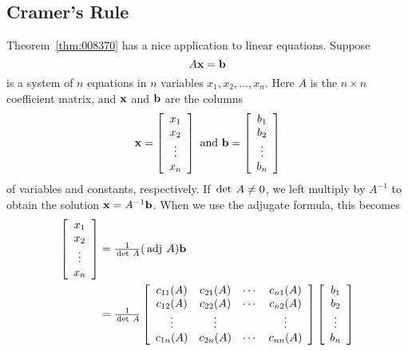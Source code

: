 \subsection*{Cramer's Rule}

Theorem~\ref{thm:008370} has a nice application to linear equations. Suppose
\begin{equation*}
A\textbf{x}=\textbf{b}
\end{equation*}
is a system of $n$ equations in $n$ variables $x_{1}, x_{2}, \dots , x_{n}$. Here $A$ is the $n \times n$ coefficient matrix, and $\textbf{x}$ and $\textbf{b}$ are the columns
\begin{equation*}
\textbf{x} = \left[ \begin{array}{c}
x_1 \\
x_2 \\
\vdots \\
x_n 
\end{array} \right] \mbox{ and }
\textbf{b} = \left[ \begin{array}{c}
b_1 \\
b_2 \\
\vdots \\
b_n 
\end{array} \right] 
\end{equation*}
of variables and constants, respectively. If $\thinspace\operatorname{det \medspace}A \neq 0$, we left multiply by $A^{-1}$ to obtain the solution $\textbf{x} = A^{-1}\textbf{b}$. When we use the adjugate formula, this becomes
\begin{align*}
\left[ \begin{array}{c}
x_1 \\
x_2 \\
\vdots \\
x_n 
\end{array} \right] &= \tfrac{1}{\thinspace\operatorname{det \medspace} A} (\thinspace\operatorname{adj \medspace} A)\textbf{b} \\
&= \tfrac{1}{\thinspace\operatorname{det \medspace} A}
\left[ \begin{array}{cccc}
c_{11}(A) & c_{21}(A) & \cdots & c_{n1}(A) \\
c_{12}(A) & c_{22}(A) & \cdots & c_{n2}(A) \\
\vdots & \vdots & & \vdots \\
c_{1n}(A) & c_{2n}(A) & \cdots & c_{nn}(A)
\end{array}\right]
 \left[ \begin{array}{c}
b_1 \\
b_2 \\
\vdots \\
b_n 
\end{array} \right] 
\end{align*}
